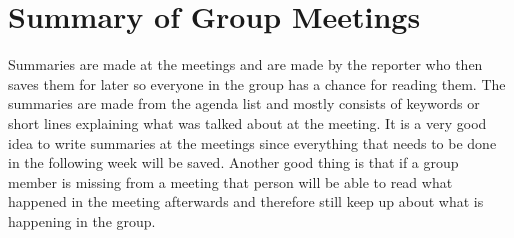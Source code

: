 \section{Summary of Group Meetings}
Summaries are made at the meetings and are made by the reporter who then saves them for later so everyone in the group has a chance for reading them. 
The summaries are made from the agenda list and mostly consists of keywords or short lines explaining what was talked about at the meeting.
It is a very good idea to write summaries at the meetings since everything that needs to be done in the following week will be saved. 
Another good thing is that if a group member is missing from a meeting that person will be able to read what happened in the meeting afterwards and therefore still keep up about what is happening in the group.